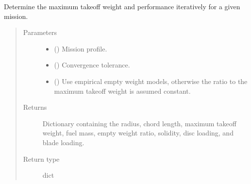 \documentclass[letterpaper,10pt,english]{sphinxmanual}
\begin{document}
\begin{fulllineitems}
\begin{fulllineitems}
\label{\detokenize{modules/helicopter:helicopter.Helicopter.sizing_loop}}
\sphinxAtStartPar
Determine the maximum take\sphinxhyphen{}off weight and performance iteratively for a
given mission.
\begin{quote}\begin{description}
\item[{Parameters}] \leavevmode\begin{itemize}
\item {} 
\sphinxAtStartPar
{} ({\hyperref[\detokenize{modules/mission:mission.Mission}]{}}) \textendash{} Mission profile.

\item {} 
\sphinxAtStartPar
{} () \textendash{} Convergence tolerance.

\item {} 
\sphinxAtStartPar
{} () \textendash{} Use empirical empty weight models, otherwise the ratio to the
maximum take\sphinxhyphen{}off weight is assumed constant.

\end{itemize}

\item[{Returns}] \leavevmode
\sphinxAtStartPar
Dictionary containing the radius, chord length, maximum take\sphinxhyphen{}off
weight, fuel mass, empty weight ratio, solidity, disc loading, and
blade loading.

\item[{Return type}] \leavevmode
\sphinxAtStartPar
dict

\end{description}\end{quote}

\end{fulllineitems}


\end{fulllineitems}
\end{document}
